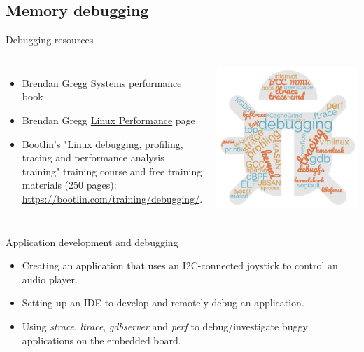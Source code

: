\subsection{Memory debugging}



\begin{frame}{Debugging resources}
  \begin{columns}
  \begin{itemize}
  \item Brendan Gregg
    \href{https://www.brendangregg.com/systems-performance-2nd-edition-book.html}{Systems
      performance} book
  \item Brendan Gregg
    \href{https://www.brendangregg.com/linuxperf.html}{Linux
      Performance} page
  \item Bootlin's "Linux debugging, profiling, tracing and performance
        analysis training" training course and free training materials
        (250 pages): \url{https://bootlin.com/training/debugging/}.
  \end{itemize}
  \includegraphics[height=0.6\textheight]{slides/debugging-principles/cloud_word.png}
  \end{columns}
\end{frame}

\setuplabframe
{Application development and debugging}
{
  \begin{itemize}
  \item Creating an application that uses an I2C-connected joystick to
    control an audio player.
  \item Setting up an IDE to develop and remotely debug an
    application.
  \item Using {\em strace}, {\em ltrace}, {\em gdbserver} and {\em
      perf} to debug/investigate buggy applications on the embedded
    board.
  \end{itemize}
}
